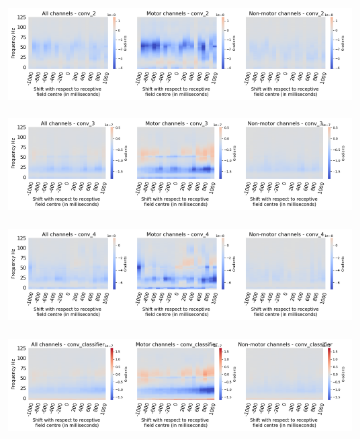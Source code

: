 \begin{figure}[!htpb]
\centering
\begin{subfigure}[b]{\textwidth}
   \includegraphics[width=0.85\linewidth]{img/appendix/C/m/absVel/sbp0_m_shift_gradients_conv_2_all_kinds}
   \caption{}
   \label{fig:absVel-shifting-grads-conv-2}
\end{subfigure}

\begin{subfigure}[b]{\textwidth}
   \includegraphics[width=0.85\linewidth]{img/appendix/C/m/absVel/sbp0_m_shift_gradients_conv_3_all_kinds}
   \caption{}
   \label{fig:absVel-shifting-grads-conv-3}
\end{subfigure}

\begin{subfigure}[b]{\textwidth}
   \includegraphics[width=0.85\linewidth]{img/appendix/C/m/absVel/sbp0_m_shift_gradients_conv_4_all_kinds}
   \caption{}
   \label{fig:absVel-shifting-grads-conv-4}
\end{subfigure}

\begin{subfigure}[b]{\textwidth}
   \includegraphics[width=0.85\linewidth]{img/appendix/C/m/absVel/sbp0_m_shift_gradients_conv_classifier_all_kinds}
   \caption{}
   \label{fig:absVel-shifting-grads-conv-classifier}
\end{subfigure}


\end{figure}
